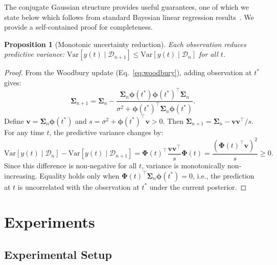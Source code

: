 \documentclass[final]{article}
\newtheorem{proposition}{Proposition}
\begin{document}
The conjugate Gaussian structure provides useful guarantees, one of which we state below which follows from standard Bayesian linear regression results~\citep{bishop2006pattern, williams2006gaussian}. We provide a self-contained proof for completeness.

\begin{proposition}[Monotonic uncertainty reduction]
\label{prop:monotone}
Each observation reduces predictive variance: $\mathrm{Var}[y(t) \mid \mathcal{D}_{n+1}] \leq \mathrm{Var}[y(t) \mid \mathcal{D}_n]$ for all $t$.
\end{proposition}

\begin{proof}
From the Woodbury update (Eq.~\ref{eq:woodbury}), adding observation at $t^*$ gives:
\[
\boldsymbol{\Sigma}_{n+1} = \boldsymbol{\Sigma}_n - \frac{\boldsymbol{\Sigma}_n \boldsymbol{\phi}(t^*) \boldsymbol{\phi}(t^*)^\top \boldsymbol{\Sigma}_n}{\sigma^2 + \boldsymbol{\phi}(t^*)^\top \boldsymbol{\Sigma}_n \boldsymbol{\phi}(t^*)}.
\]
Define $\mathbf{v} = \boldsymbol{\Sigma}_n \boldsymbol{\phi}(t^*)$ and $s = \sigma^2 + \boldsymbol{\phi}(t^*)^\top \mathbf{v} > 0$. Then $\boldsymbol{\Sigma}_{n+1} = \boldsymbol{\Sigma}_n - \mathbf{v}\mathbf{v}^\top / s$. For any time $t$, the predictive variance changes by:
\[
\mathrm{Var}[y(t) \mid \mathcal{D}_n] - \mathrm{Var}[y(t) \mid \mathcal{D}_{n+1}] = \boldsymbol{\Phi}(t)^\top \frac{\mathbf{v}\mathbf{v}^\top}{s} \boldsymbol{\Phi}(t) = \frac{(\boldsymbol{\Phi}(t)^\top \mathbf{v})^2}{s} \geq 0.
\]
Since this difference is non-negative for all $t$, variance is monotonically non-increasing. Equality holds only when $\boldsymbol{\Phi}(t)^\top \boldsymbol{\Sigma}_n \boldsymbol{\phi}(t^*) = 0$, i.e., the prediction at $t$ is uncorrelated with the observation at $t^*$ under the current posterior.
\end{proof}

\section{Experiments}
\label{sec:experiments}

\subsection{Experimental Setup}
\end{document}
